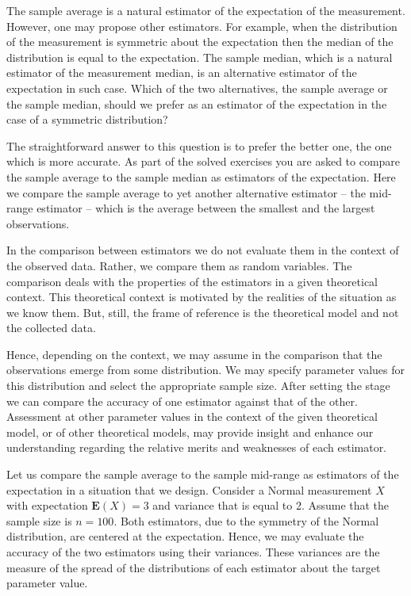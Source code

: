 \documentclass[]{krantz}
\newcommand{\Expec}{\mathbf{E}}
\theoremstyle{definition}
\theoremstyle{definition}
\theoremstyle{definition}
\theoremstyle{remark}
\begin{document}
The sample average is a natural estimator of the expectation of the
measurement. However, one may propose other estimators. For example,
when the distribution of the measurement is symmetric about the
expectation then the median of the distribution is equal to the
expectation. The sample median, which is a natural estimator of the
measurement median, is an alternative estimator of the expectation in
such case. Which of the two alternatives, the sample average or the
sample median, should we prefer as an estimator of the expectation in
the case of a symmetric distribution?

The straightforward answer to this question is to prefer the better one,
the one which is more accurate. As part of the solved exercises you are
asked to compare the sample average to the sample median as estimators
of the expectation. Here we compare the sample average to yet another
alternative estimator -- the mid-range estimator -- which is the average
between the smallest and the largest observations.

In the comparison between estimators we do not evaluate them in the
context of the observed data. Rather, we compare them as random
variables. The comparison deals with the properties of the estimators in
a given theoretical context. This theoretical context is motivated by
the realities of the situation as we know them. But, still, the frame of
reference is the theoretical model and not the collected data.

Hence, depending on the context, we may assume in the comparison that
the observations emerge from some distribution. We may specify parameter
values for this distribution and select the appropriate sample size.
After setting the stage we can compare the accuracy of one estimator
against that of the other. Assessment at other parameter values in the
context of the given theoretical model, or of other theoretical models,
may provide insight and enhance our understanding regarding the relative
merits and weaknesses of each estimator.

Let us compare the sample average to the sample mid-range as estimators
of the expectation in a situation that we design. Consider a Normal
measurement \(X\) with expectation \(\Expec(X) = 3\) and variance that is
equal to 2. Assume that the sample size is \(n = 100\). Both estimators,
due to the symmetry of the Normal distribution, are centered at the
expectation. Hence, we may evaluate the accuracy of the two estimators
using their variances. These variances are the measure of the spread of
the distributions of each estimator about the target parameter value.
\end{document}
